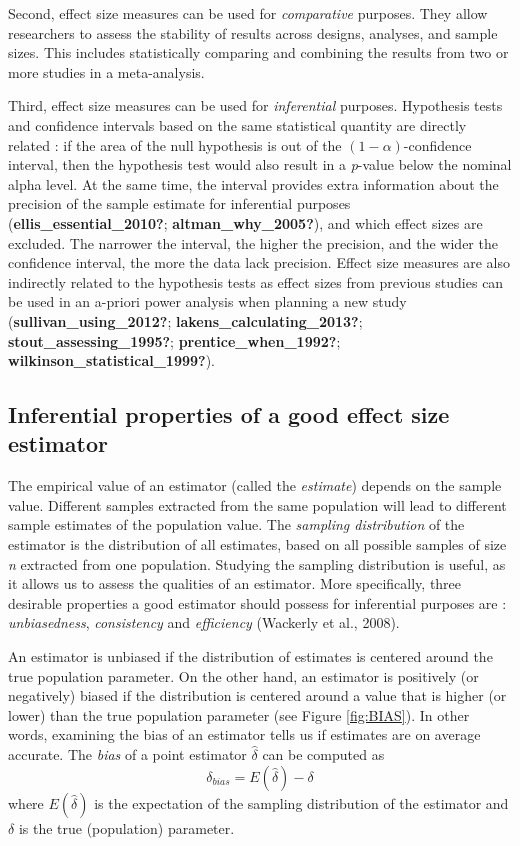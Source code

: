 \documentclass[
  english,
  man]{apa6}
\begin{document}
Second, effect size measures can be used for \emph{comparative} purposes. They allow researchers to assess the stability of results across designs, analyses, and sample sizes. This includes statistically comparing and combining the results from two or more studies in a meta-analysis.

Third, effect size measures can be used for \emph{inferential} purposes. Hypothesis tests and confidence intervals based on the same statistical quantity are directly related : if the area of the null hypothesis is out of the \((1-\alpha)\)-confidence interval, then the hypothesis test would also result in a \emph{p}-value below the nominal alpha level. At the same time, the interval provides extra information about the precision of the sample estimate for inferential purposes (\textbf{ellis\_essential\_2010?}; \textbf{altman\_why\_2005?}), and which effect sizes are excluded. The narrower the interval, the higher the precision, and the wider the confidence interval, the more the data lack precision. Effect size measures are also indirectly related to the hypothesis tests as effect sizes from previous studies can be used in an a-priori power analysis when planning a new study (\textbf{sullivan\_using\_2012?}; \textbf{lakens\_calculating\_2013?}; \textbf{stout\_assessing\_1995?}; \textbf{prentice\_when\_1992?}; \textbf{wilkinson\_statistical\_1999?}).

\hypertarget{inferential-properties-of-a-good-effect-size-estimator}{%
\subsection{Inferential properties of a good effect size estimator}\label{inferential-properties-of-a-good-effect-size-estimator}}

The empirical value of an estimator (called the \emph{estimate}) depends on the sample value. Different samples extracted from the same population will lead to different sample estimates of the population value. The \emph{sampling distribution} of the estimator is the distribution of all estimates, based on all possible samples of size \emph{n} extracted from one population. Studying the sampling distribution is useful, as it allows us to assess the qualities of an estimator. More specifically, three desirable properties a good estimator should possess for inferential purposes are : \emph{unbiasedness}, \emph{consistency} and \emph{efficiency} (Wackerly et al., 2008).

An estimator is unbiased if the distribution of estimates is centered around the true population parameter. On the other hand, an estimator is positively (or negatively) biased if the distribution is centered around a value that is higher (or lower) than the true population parameter (see Figure \ref{fig:BIAS}). In other words, examining the bias of an estimator tells us if estimates are on average accurate. The \emph{bias} of a point estimator \(\hat{\delta}\) can be computed as
\begin{equation} 
\delta_{bias}=E(\hat{\delta})-\delta
\label{eqn:BIAS}
\end{equation}
where \(E(\hat{\delta})\) is the expectation of the sampling distribution of the estimator and \(\delta\) is the true (population) parameter.
\end{document}
